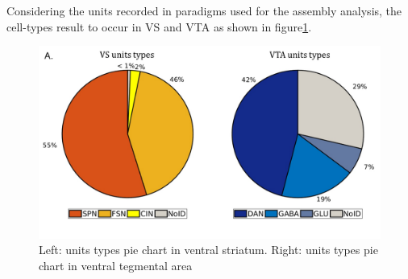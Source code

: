 Considering the units recorded in paradigms used for the assembly analysis, the cell-types result to occur in VS and VTA as shown in figure\ref{fig:PieRegions}.
\begin{figure}
  \centering
    \includegraphics[scale=0.5]{figures/PieRegions1.pdf}
   \caption{Left: units types pie chart in ventral striatum. Right: units types pie chart in ventral tegmental area}
    \label{fig:PieRegions}
\end{figure}


